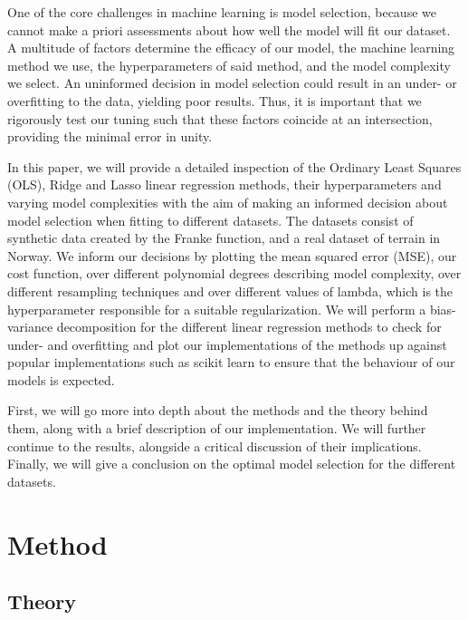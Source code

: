 \documentclass[twocolumn,10pt,cleanfoot]{asme2ej}
\begin{document}
One of the core challenges in machine learning is model selection, because we cannot make a priori assessments about how well the model will fit our dataset. A multitude of factors determine the efficacy of our model, the machine learning method we use, the hyperparameters of said method, and the model complexity we select. An uninformed decision in model selection could result in an under- or overfitting to the data, yielding poor results. Thus, it is important that we rigorously test our tuning such that these factors coincide at an intersection, providing the minimal error in unity.

In this paper, we will provide a detailed inspection of the Ordinary Least Squares (OLS), Ridge and Lasso linear regression methods, their hyperparameters and varying model complexities with the aim of making an informed decision about model selection when fitting to different datasets. The datasets consist of synthetic data created by the Franke function, and a real dataset of terrain in Norway. We inform our decisions by plotting the mean squared error (MSE), our cost function, over different polynomial degrees describing model complexity, over different resampling techniques and over different values of lambda, which is the hyperparameter responsible for a suitable regularization. We will perform a bias-variance decomposition for the different linear regression methods to check for under- and overfitting and plot our implementations of the methods up against popular implementations such as scikit learn to ensure that the behaviour of our models is expected.

First, we will go more into depth about the methods and the theory behind them, along with a brief description of our implementation. We will further continue to the results, alongside a critical discussion of their implications. Finally, we will give a conclusion on the optimal model selection for the different datasets.





\section{Method}

\subsection{Theory}
\end{document}
